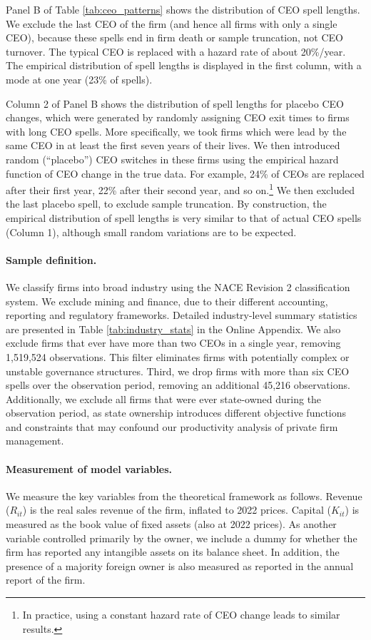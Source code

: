 \documentclass[11pt,a4paper]{article}
\begin{document}
Panel B of Table \ref{tab:ceo_patterns} shows the distribution of CEO spell lengths. We exclude the last CEO of the firm (and hence all firms with only a single CEO), because these spells end in firm death or sample truncation, not CEO turnover. The typical CEO is replaced with a hazard rate of about 20\%/year. The empirical distribution of spell lengths is displayed in the first column, with a mode at one year (23\% of spells).

Column 2 of Panel B shows the distribution of spell lengths for placebo CEO changes, which were generated by randomly assigning CEO exit times to firms with long CEO spells. More specifically, we took firms which were lead by the same CEO in at least the first seven years of their lives. We then introduced random (``placebo'') CEO switches in these firms using the empirical hazard function of CEO change in the true data. For example, 24\% of CEOs are replaced after their first year, 22\% after their second year, and so on.\footnote{In practice, using a constant hazard rate of CEO change leads to similar results.} We then excluded the last placebo spell, to exclude sample truncation. By construction, the empirical distribution of spell lengths is very similar to that of actual CEO spells (Column 1), although small random variations are to be expected.

\paragraph{Sample definition.} 
We classify firms into broad industry using the NACE Revision 2 classification system. We exclude mining and finance, due to their different accounting, reporting and regulatory frameworks. Detailed industry-level summary statistics are presented in Table \ref{tab:industry_stats} in the Online Appendix. We also exclude firms that ever have more than two CEOs in a single year, removing 1,519,524 observations. This filter eliminates firms with potentially complex or unstable governance structures. Third, we drop firms with more than six CEO spells over the observation period, removing an additional 45,216 observations. Additionally, we exclude all firms that were ever state-owned during the observation period, as state ownership introduces different objective functions and constraints that may confound our productivity analysis of private firm management.

\paragraph{Measurement of model variables.} We measure the key variables from the theoretical framework as follows. Revenue ($R_{it}$) is the real sales revenue of the firm, inflated to 2022 prices. Capital ($K_{it}$) is measured as the book value of fixed assets (also at 2022 prices). As another variable controlled primarily by the owner, we include a dummy for whether the firm has reported any intangible assets on its balance sheet. In addition, the presence of a majority foreign owner is also measured as reported in the annual report of the firm.
\end{document}
